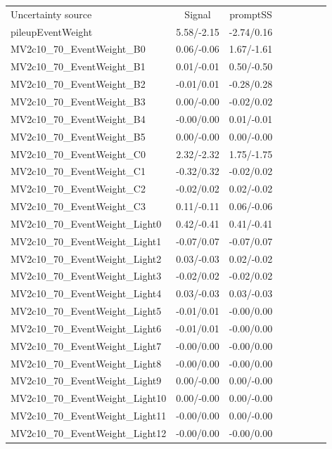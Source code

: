 \begin{table}[h]
\scriptsize
\begin{center}
\begin{tabular}{l|ccccccc}
\hline
\hline
Uncertainty source &Signal &promptSS \\
pileupEventWeight &5.58/-2.15 &-2.74/0.16 \\
MV2c10\_70\_EventWeight\_B0 &0.06/-0.06 &1.67/-1.61 \\
MV2c10\_70\_EventWeight\_B1 &0.01/-0.01 &0.50/-0.50 \\
MV2c10\_70\_EventWeight\_B2 &-0.01/0.01 &-0.28/0.28 \\
MV2c10\_70\_EventWeight\_B3 &0.00/-0.00 &-0.02/0.02 \\
MV2c10\_70\_EventWeight\_B4 &-0.00/0.00 &0.01/-0.01 \\
MV2c10\_70\_EventWeight\_B5 &0.00/-0.00 &0.00/-0.00 \\
MV2c10\_70\_EventWeight\_C0 &2.32/-2.32 &1.75/-1.75 \\
MV2c10\_70\_EventWeight\_C1 &-0.32/0.32 &-0.02/0.02 \\
MV2c10\_70\_EventWeight\_C2 &-0.02/0.02 &0.02/-0.02 \\
MV2c10\_70\_EventWeight\_C3 &0.11/-0.11 &0.06/-0.06 \\
MV2c10\_70\_EventWeight\_Light0 &0.42/-0.41 &0.41/-0.41 \\
MV2c10\_70\_EventWeight\_Light1 &-0.07/0.07 &-0.07/0.07 \\
MV2c10\_70\_EventWeight\_Light2 &0.03/-0.03 &0.02/-0.02 \\
MV2c10\_70\_EventWeight\_Light3 &-0.02/0.02 &-0.02/0.02 \\
MV2c10\_70\_EventWeight\_Light4 &0.03/-0.03 &0.03/-0.03 \\
MV2c10\_70\_EventWeight\_Light5 &-0.01/0.01 &-0.00/0.00 \\
MV2c10\_70\_EventWeight\_Light6 &-0.01/0.01 &-0.00/0.00 \\
MV2c10\_70\_EventWeight\_Light7 &-0.00/0.00 &-0.00/0.00 \\
MV2c10\_70\_EventWeight\_Light8 &-0.00/0.00 &-0.00/0.00 \\
MV2c10\_70\_EventWeight\_Light9 &0.00/-0.00 &0.00/-0.00 \\
MV2c10\_70\_EventWeight\_Light10 &0.00/-0.00 &0.00/-0.00 \\
MV2c10\_70\_EventWeight\_Light11 &-0.00/0.00 &0.00/-0.00 \\
MV2c10\_70\_EventWeight\_Light12 &-0.00/0.00 &-0.00/0.00 \\

\end{tabular}
\end{center}
\end{table}
